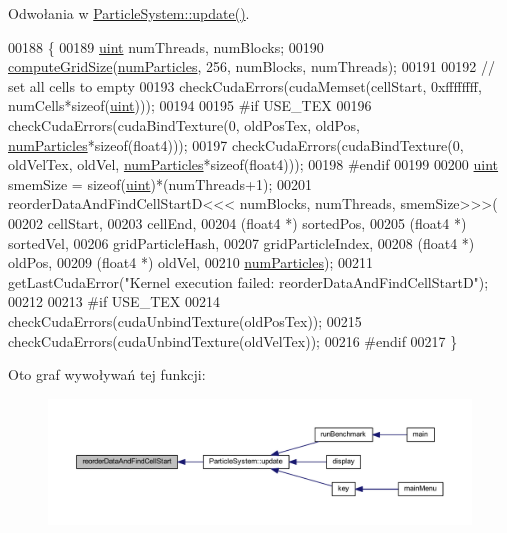 Odwołania w \hyperlink{particle_system_8cpp_source_l00238}{Particle\-System\-::update()}.


\begin{DoxyCode}
00188     \{
00189         \hyperlink{particles__kernel_8cuh_a91ad9478d81a7aaf2593e8d9c3d06a14}{uint} numThreads, numBlocks;
00190         \hyperlink{particle_system__cuda_8cu_a78e8aa50e0629b57cff219a2fa753ed0}{computeGridSize}(\hyperlink{particles_8cpp_a05b8a90212054a3eb1a036ae0c269596}{numParticles}, 256, numBlocks, numThreads);
00191 
00192         \textcolor{comment}{// set all cells to empty}
00193         checkCudaErrors(cudaMemset(cellStart, 0xffffffff, numCells*\textcolor{keyword}{sizeof}(\hyperlink{particles__kernel_8cuh_a91ad9478d81a7aaf2593e8d9c3d06a14}{uint})));
00194 
00195 \textcolor{preprocessor}{#if USE\_TEX}
00196 \textcolor{preprocessor}{}        checkCudaErrors(cudaBindTexture(0, oldPosTex, oldPos, \hyperlink{particles_8cpp_a05b8a90212054a3eb1a036ae0c269596}{numParticles}*\textcolor{keyword}{sizeof}(float4)));
00197         checkCudaErrors(cudaBindTexture(0, oldVelTex, oldVel, \hyperlink{particles_8cpp_a05b8a90212054a3eb1a036ae0c269596}{numParticles}*\textcolor{keyword}{sizeof}(float4)));
00198 \textcolor{preprocessor}{#endif}
00199 \textcolor{preprocessor}{}
00200         \hyperlink{particles__kernel_8cuh_a91ad9478d81a7aaf2593e8d9c3d06a14}{uint} smemSize = \textcolor{keyword}{sizeof}(\hyperlink{particles__kernel_8cuh_a91ad9478d81a7aaf2593e8d9c3d06a14}{uint})*(numThreads+1);
00201         reorderDataAndFindCellStartD<<< numBlocks, numThreads, smemSize>>>(
00202             cellStart,
00203             cellEnd,
00204             (float4 *) sortedPos,
00205             (float4 *) sortedVel,
00206             gridParticleHash,
00207             gridParticleIndex,
00208             (float4 *) oldPos,
00209             (float4 *) oldVel,
00210             \hyperlink{particles_8cpp_a05b8a90212054a3eb1a036ae0c269596}{numParticles});
00211         getLastCudaError(\textcolor{stringliteral}{"Kernel execution failed: reorderDataAndFindCellStartD"});
00212 
00213 \textcolor{preprocessor}{#if USE\_TEX}
00214 \textcolor{preprocessor}{}        checkCudaErrors(cudaUnbindTexture(oldPosTex));
00215         checkCudaErrors(cudaUnbindTexture(oldVelTex));
00216 \textcolor{preprocessor}{#endif}
00217 \textcolor{preprocessor}{}    \}
\end{DoxyCode}


Oto graf wywoływań tej funkcji\-:\nopagebreak
\begin{figure}[H]
\begin{center}
\leavevmode
\includegraphics[width=350pt]{particle_system__cuda_8cu_ac72ccd068434c46c2f901c751d53be1d_icgraph}
\end{center}
\end{figure}



